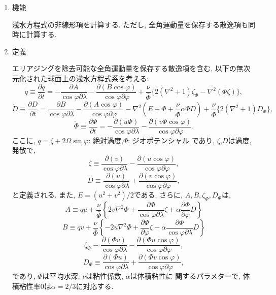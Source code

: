 \documentclass[a4j,fleqn]{jarticle}
\begin{document}
\begin{enumerate}

\item 機能

浅水方程式の非線形項を計算する. 
ただし, 全角運動量を保存する散逸項も同時に計算する.

\item 定義

エリアジングを除去可能な全角運動量を保存する散逸項を含む,
以下の無次元化された球面上の浅水方程式系を考える:
\begin{equation}
\dot{q}\equiv\frac{\partial q}{\partial t}
=-\frac{\partial A}{\cos\varphi\partial\lambda}
-\frac{\partial(B\cos\varphi)}{\cos\varphi\partial\varphi}
+\frac{\nu}{\bar\Phi}\{2(\nabla^2+1)\zeta_{\Phi}-\nabla^2(\Phi\zeta)\},
\end{equation}
\begin{equation}
\dot{D}\equiv\frac{\partial D}{\partial t}
=\frac{\partial B}{\cos\varphi\partial\lambda}
-\frac{\partial(A\cos\varphi)}{\cos\varphi\partial\varphi}
-\nabla^2(E+\Phi+\frac{\nu}{\bar\Phi}\alpha\Phi D)
+\frac{\nu}{\bar\Phi}\{2(\nabla^2+1)D_{\Phi}\},
\end{equation}
\begin{equation}
\dot{\Phi}\equiv\frac{\partial \Phi}{\partial t}
=-\frac{\partial(u\Phi)}{\cos\varphi\partial\lambda}
-\frac{\partial(v\Phi\cos\varphi)}{\cos\varphi\partial\varphi}.
\end{equation}
ここに, $q=\zeta+2\Omega\sin\varphi$: 絶対渦度,$\Phi$: ジオポテンシャル
であり, $\zeta$,$D$は渦度, 発散で,
\begin{equation}
\zeta\equiv
\frac{\partial(v)}{\cos\varphi\partial\lambda}
-\frac{\partial(u\cos\varphi)}{\cos\varphi\partial\varphi},
\end{equation}
\begin{equation}
D\equiv
\frac{\partial(u)}{\cos\varphi\partial\lambda}
+\frac{\partial(v\cos\varphi)}{\cos\varphi\partial\varphi},
\end{equation}
と定義される. また, $E=(u^2+v^2)/2$である.
さらに, $A,B,\zeta_{\Phi},D_{\Phi}$は,
\begin{equation}
A\equiv qu+\frac{\nu}{\bar\Phi}\left\{2v\nabla^2\Phi
+\frac{\partial\Phi}{\cos\varphi\partial\lambda}\zeta
+\alpha\frac{\partial\Phi}{\partial\varphi}D\right\}
\end{equation}
\begin{equation}
B\equiv qv+\frac{\nu}{\bar\Phi}\left\{-2u\nabla^2\Phi
+\frac{\partial\Phi}{\partial\varphi}\zeta
-\alpha\frac{\partial\Phi}{\cos\varphi\partial\lambda}D\right\}
\end{equation}
\begin{equation}
\zeta_{\Phi}\equiv
\frac{\partial(\Phi v)}{\cos\varphi\partial\lambda}
-\frac{\partial(\Phi u\cos\varphi)}{\cos\varphi\partial\varphi},
\end{equation}
\begin{equation}
D_{\Phi}\equiv
\frac{\partial(\Phi u)}{\cos\varphi\partial\lambda}
+\frac{\partial(\Phi v\cos\varphi)}{\cos\varphi\partial\varphi},
\end{equation}
であり, $\bar\Phi$は平均水深, $\nu$は粘性係数, $\alpha$は体積粘性に
関するパラメターで, 体積粘性率$0$は$\alpha=2/3$に対応する.


\end{enumerate}
\end{document}
